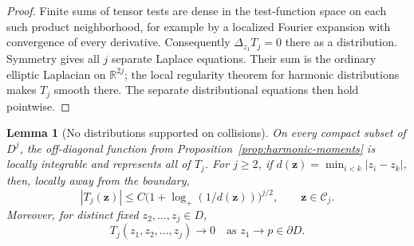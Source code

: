 \documentclass[11pt]{article}
\newtheorem{lemma}[theorem]{Lemma}
\theoremstyle{definition}
\theoremstyle{remark}
\numberwithin{equation}{section}
\begin{document}
\begin{proof}
Finite sums of tensor tests are dense in the test-function space
on each such product neighborhood, for example by a localized
Fourier expansion with convergence of every derivative.
Consequently \(\Delta_{z_1}T_j=0\) there as a distribution.
Symmetry gives all \(j\) separate Laplace equations.  Their sum is
the ordinary elliptic Laplacian on \(\mathbb R^{2j}\); the local regularity
theorem for harmonic distributions makes \(T_j\) smooth there.
The separate distributional equations then hold pointwise.
\end{proof}

\begin{lemma}[No distributions supported on collisions]
\label{lem:no-diagonal}
On every compact subset of \(D^j\), the off-diagonal function from
Proposition~\ref{prop:harmonic-moments} is locally integrable and
represents all of \(T_j\).  For \(j\ge2\), if
\(d(\mathbf z)=\min_{i<k}|z_i-z_k|\), then, locally away from
the boundary,
\begin{equation}
 |T_j(\mathbf z)|
 \le C\bigl(1+\log_+(1/d(\mathbf z))\bigr)^{j/2},
 \qquad \mathbf z\in\mathcal C_j.
 \label{eq:limit-log-bound}
\end{equation}
Moreover, for distinct fixed \(z_2,\ldots,z_j\in D\),
\begin{equation}
 T_j(z_1,z_2,\ldots,z_j)\longrightarrow0
        \quad\text{as }z_1\longrightarrow p\in\partial D.
 \label{eq:limit-zero-boundary}
\end{equation}
\end{lemma}
\end{document}
